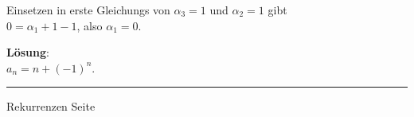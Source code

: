 \begin{slide}{}
Einsetzen in erste Gleichungs von $\alpha_3 = 1$ und $\alpha_2 = 1$ gibt \\[0.3cm]
\hspace*{1.3cm} $0 = \alpha_1 + 1 - 1$, \quad also \quad $\alpha_1 = 0$.

\textbf{L\"osung}: \\[0.3cm]
\hspace*{1.3cm} $a_n = n + (-1)^n$.



\vspace*{\fill}
\tiny \addtocounter{mypage}{1}
\rule{17cm}{1mm}
Rekurrenzen  \hspace*{\fill} Seite 
\end{slide}


